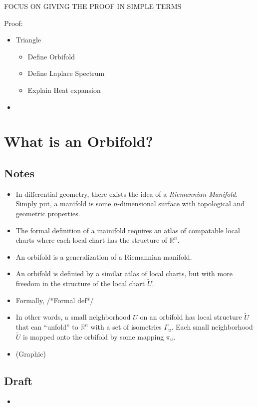 \documentclass{article}
\begin{document}
FOCUS ON GIVING THE PROOF IN SIMPLE TERMS

Proof:
\begin{itemize}
    \item Triangle
        \begin{itemize}
            \item Define Orbifold
            \item Define Laplace Spectrum
            \item Explain Heat expansion
        \end{itemize}
    \item 
\end{itemize}

\section{What is an Orbifold?}
\subsection{Notes}
\begin{itemize}
    \item In differential geometry, there exists the idea of a \emph{Riemannian Manifold}. Simply put, a manifold is some $n$-dimensional surface with topological and geometric properties.
    \item The formal definition of a mainifold requires an atlas of compatable local charts where each local chart has the structure of $\mathbb{R}^n$.
    \item An orbifold is a generalization of a Riemannian manifold.
    \item An orbifold is definied by a similar atlas of local charts, but with more freedom in the structure of the local chart $\tilde{U}$.
    \item Formally, /*Formal def*/
    \item In other words, a small neighborhood $U$ on an orbifold has local structure $\tilde{U}$ that can ``unfold'' to $\mathbb{R}^n$ with a set of isometries $\Gamma_u$. Each small neighborhood $\tilde{U}$ is mapped onto the orbifold by some mapping $\pi_u$. 
    \item (Graphic)
\end{itemize}
\subsection{Draft}
\begin{itemize}
    \item 
\end{itemize}
\end{document}
